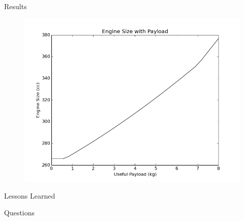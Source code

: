 \documentclass{beamer}
\begin{document}
\begin{frame}{Results}
	\begin{figure}
		\begin{center}
			\includegraphics[width=.70\textwidth]{../engine_size_vs_payload.png}
			\label{fig:pareto}
		\end{center}
	\end{figure}
\end{frame}

\begin{frame}{Lessons Learned}

\end{frame}

\begin{frame}{Questions}

\end{frame}
\end{document}
